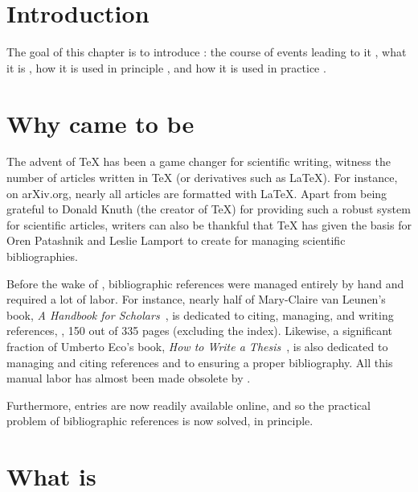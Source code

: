 
\section{Introduction}
The goal of this chapter is to introduce {\bibtex}: the course of
events leading to it , what it is
, how it is used in principle
, and how it is used in practice
.


\section{Why {\bibtex} came to be}
\label{sec:why_bibtex_came_to_be}

The advent of {\TeX} has been a game changer for scientific writing,
witness the number of articles written in {\TeX} (or derivatives such
as {\LaTeX}).  For instance, on arXiv.org, nearly all articles are
formatted with \LaTeX.  Apart from being grateful to Donald Knuth (the
creator of \TeX) for providing such a robust system for scientific
articles, writers can also be thankful that {\TeX} has given the basis
for Oren Patashnik and Leslie Lamport to create {\bibtex} for managing
scientific bibliographies.

Before the wake of {\bibtex}, bibliographic references were managed
entirely by hand and required a lot of labor.  For instance, nearly
half of Mary-Claire van Leunen's book, \textit{A Handbook for
  Scholars}~\cite{leunen1992_handbook}, is dedicated to citing,
managing, and writing references, \ie, 150 out of 335 pages (excluding
the index).  Likewise, a significant fraction of Umberto Eco's book,
\textit{How to Write a Thesis}~\cite{eco1985_thesis}, is also
dedicated to managing and citing references and to ensuring a proper
bibliography.  All this manual labor has almost been made obsolete by
{\bibtex}.

Furthermore, {\bibtex} entries are now readily available online, and so
the practical problem of bibliographic references is now solved, in
principle.

\section{What is {\bibtex}}
\label{sec:principles_of_bibtex}


